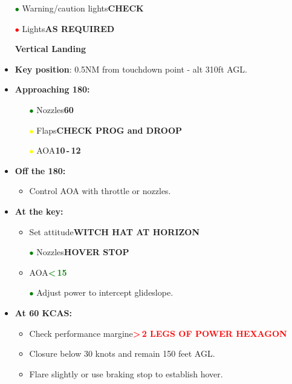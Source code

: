 \documentclass[a4paper,12pt,dvipsnames]{letter}
\newcommand{\button}[1]{\textbf{#1}}
\newcommand{\Deg}{\textdegree{}}
\newcommand{\ok}[1]{\textcolor{Green}{\textbf{#1}}}
\newcommand{\warn}[1]{\textcolor{Red}{\textbf{#1}}}
\newcommand{\ri}{\textcolor{Red}{$\bullet$\;}}
\newcommand{\gi}{\textcolor{Green}{$\bullet$\;}}
\newcommand{\yi}{\textcolor{Yellow}{$\bullet$\;}}
\begin{document}
{\begin{itemize}
\begin{itemize}
 \item Green water flow light in HUD\dotfill\button{CHECK}
 \item[\yi] Water switch\dotfill\button{AS REQUIRED}
\end{itemize}
\item[\gi] Warning/caution lights\dotfill\button{CHECK}
\item[\ri] Lights\dotfill\button{AS REQUIRED}
\end{itemize}
\newpage
\begin{itemize}
\item[] {\LARGE\textbf{Vertical Landing}}
\item \button{Key position}: 0.5\;NM from touchdown point - alt 310\;ft AGL.
\item \button{Approaching 180:}
\begin{itemize}
 \item[\gi] Nozzles\dotfill\button{60\Deg}
 \item[\yi] Flaps\dotfill\button{CHECK PROG and DROOP}
 \item[\yi] AOA\dotfill\button{10\Deg\,-\,12\Deg}
\end{itemize}
\item \button{Off the 180:}
\begin{itemize}
 \item Control AOA with throttle or nozzles.
\end{itemize}
\item \button{At the key:}
\begin{itemize}
 \item Set attitude\dotfill\button{WITCH HAT AT HORIZON}
 \item[\gi] Nozzles\dotfill\button{HOVER STOP}
 \item AOA\dotfill\ok{<\,15\Deg}
 \item[\gi] Adjust power to intercept glideslope.
\end{itemize}
\item \button{At 60 KCAS:}
\begin{itemize}
 \item Check performance margine\dotfill\warn{>\,2 LEGS OF POWER HEXAGON}
 \item Closure below 30 knots and remain 150 feet AGL.
 \item Flare slightly or use braking stop to establish hover.

\end{itemize}
\end{itemize}}
\end{document}
